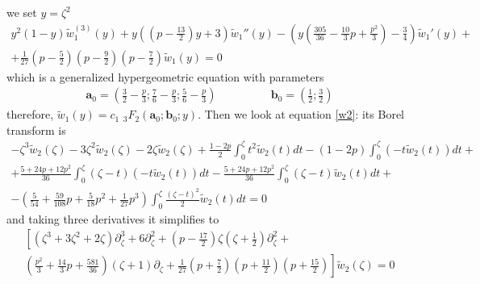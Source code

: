 \documentclass{article}
\theoremstyle{definition}
\begin{document}
we set $y=\zeta^2$
\begin{multline}\label{eq:hw1}
y^2(1-y)\tilde{w}_1^{(3)}(y)+y\left((p-\frac{13}{2})y+3\right)\tilde{w}_1''(y)-\left(y\left(\frac{305}{36}-\frac{10}{3}p+\frac{p^2}{3}\right)-\frac{3}{4}\right)\tilde{w}_1'(y)+\\
+\frac{1}{27}\left(p-\frac{5}{2}\right)\left(p-\frac{9}{2}\right)\left(p-\frac{7}{2}\right)\tilde{w}_1(y)=0
\end{multline}
which is a generalized hypergeometric equation  \cite[Equation 16.8.5]{dlmf} with parameters
\begin{align*}
\mathbf{a}_0=\left(\frac{3}{2}-\frac{p}{3};\frac{7}{6}-\frac{p}{3};\frac{5}{6}-\frac{p}{3}\right) & \qquad\qquad \mathbf{b}_0=\left(\frac{1}{2};\frac{3}{2}\right)
\end{align*}
therefore, $\tilde{w}_1(y)=c_1\,\,{}_3F_2\left(\mathbf{a}_0;\mathbf{b}_0;y\right)$. 
Then we look at equation \eqref{w2}: its Borel transform is
\begin{multline}
-\zeta^3\tilde{w}_2(\zeta)-3\zeta^2\tilde{w}_2(\zeta)-2\zeta\tilde{w}_2(\zeta)+\frac{1-2p}{2}\int_0^\zeta t^2\tilde{w}_2(t)dt-(1-2p)\int_0^\zeta(-t\tilde{w}_2(t))dt+\\
+\frac{5+24p+12p^2}{36}\int_0^\zeta(\zeta-t)(-t\tilde{w}_2(t))dt
-\frac{5+24p+12p^2}{36}\int_0^\zeta(\zeta-t)\tilde{w}_2(t)dt +\\
-\left(\frac{5}{54}+\frac{59}{108}p+\frac{5}{18}p^2+\frac{1}{27}p^3\right)\int_0^\zeta\frac{(\zeta-t)^2}{2}\tilde{w}_2(t)dt=0
\end{multline} 
and taking three derivatives it simplifies to 
\begin{multline}
\left[\left(\zeta^3+3\zeta^2+2\zeta\right)\partial_\zeta^3 +6\partial_\zeta^2+\left(p-\frac{17}{2}\right)\zeta\left(\zeta+\frac{1}{2}\right)\partial_\zeta^2+\right.\\
\left. \left(\frac{p^2}{3}+\frac{14}{3}p+\frac{581}{36}\right)\left(\zeta+1\right)\partial_\zeta+\frac{1}{27}\left(p+\frac{7}{2}\right)\left(p+\frac{11}{2}\right)\left(p+\frac{15}{2}\right)\right]\tilde{w}_2(\zeta)=0
\end{multline}
\end{document}
